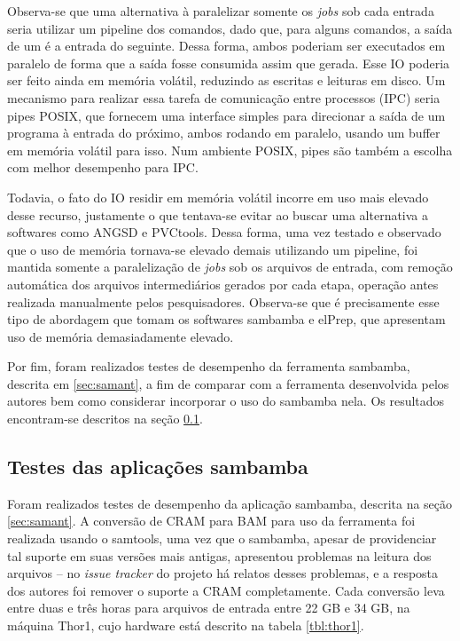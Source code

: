 \documentclass[cic,tc]{iiufrgs}
\begin{document}
Observa-se que uma alternativa à paralelizar somente os \textit{jobs} sob cada
entrada seria utilizar um pipeline dos comandos, dado que, para alguns
comandos, a saída de um é a entrada do seguinte. Dessa forma, ambos poderiam
ser executados em paralelo de forma que a saída fosse consumida assim que
gerada. Esse IO poderia ser feito ainda em memória volátil, reduzindo as
escritas e leituras em disco. Um mecanismo para realizar essa tarefa de
comunicação entre processos (IPC) seria pipes POSIX, que fornecem uma interface
simples para direcionar a saída de um programa à entrada do próximo, ambos
rodando em paralelo, usando um buffer em memória volátil para
isso.\cite{immich2003performance} Num ambiente POSIX, pipes são também a
escolha com melhor desempenho para IPC.\cite{immich2003performance}

Todavia, o fato do IO residir em memória volátil incorre em uso mais elevado
desse recurso, justamente o que tentava-se evitar ao buscar uma alternativa a
softwares como ANGSD e PVCtools. Dessa forma, uma vez testado e observado que o
uso de memória tornava-se elevado demais utilizando um pipeline, foi mantida
somente a paralelização de \textit{jobs} sob os arquivos de entrada, com
remoção automática dos arquivos intermediários gerados por cada etapa, operação
antes realizada manualmente pelos pesquisadores. Observa-se que é precisamente
esse tipo de abordagem que tomam os softwares sambamba e elPrep, que apresentam
uso de memória demasiadamente elevado.

Por fim, foram realizados testes de desempenho da ferramenta sambamba, descrita
em \ref{sec:samant}, a fim de comparar com a ferramenta desenvolvida pelos
autores bem como considerar incorporar o uso do sambamba nela. Os resultados
encontram-se descritos na seção \ref{sec:sambamba}.

\subsection{Testes das aplicações sambamba}
\label{sec:sambamba}

Foram realizados testes de desempenho da aplicação sambamba, descrita na seção
\ref{sec:samant}. A conversão de CRAM para BAM para uso da ferramenta foi
realizada usando o samtools, uma vez que o sambamba, apesar de providenciar tal
suporte em suas versões mais antigas, apresentou problemas na leitura dos
arquivos -- no \textit{issue tracker} do projeto há relatos desses problemas, e
a resposta dos autores foi remover o suporte a CRAM completamente. Cada
conversão leva entre duas e três horas para arquivos de entrada entre 22 GB e
34 GB, na máquina Thor1, cujo hardware está descrito na tabela \ref{tbl:thor1}.
\end{document}
